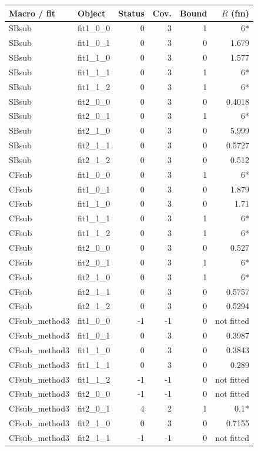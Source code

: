 \documentclass[11pt,a4paper]{article}
\begin{document}
{\scriptsize\begin{longtable}{llrrrr}\hline Macro / fit & Object & Status & Cov. & Bound & $R$ (fm)\\\hline\endhead
SBsub & fit1\_0\_0 & 0 & 3 & 1 & 6*\\
SBsub & fit1\_0\_1 & 0 & 3 & 0 & 1.679\\
SBsub & fit1\_1\_0 & 0 & 3 & 0 & 1.577\\
SBsub & fit1\_1\_1 & 0 & 3 & 1 & 6*\\
SBsub & fit1\_1\_2 & 0 & 3 & 1 & 6*\\
SBsub & fit2\_0\_0 & 0 & 3 & 0 & 0.4018\\
SBsub & fit2\_0\_1 & 0 & 3 & 1 & 6*\\
SBsub & fit2\_1\_0 & 0 & 3 & 0 & 5.999\\
SBsub & fit2\_1\_1 & 0 & 3 & 0 & 0.5727\\
SBsub & fit2\_1\_2 & 0 & 3 & 0 & 0.512\\
CFsub & fit1\_0\_0 & 0 & 3 & 1 & 6*\\
CFsub & fit1\_0\_1 & 0 & 3 & 0 & 1.879\\
CFsub & fit1\_1\_0 & 0 & 3 & 0 & 1.71\\
CFsub & fit1\_1\_1 & 0 & 3 & 1 & 6*\\
CFsub & fit1\_1\_2 & 0 & 3 & 1 & 6*\\
CFsub & fit2\_0\_0 & 0 & 3 & 0 & 0.527\\
CFsub & fit2\_0\_1 & 0 & 3 & 1 & 6*\\
CFsub & fit2\_1\_0 & 0 & 3 & 1 & 6*\\
CFsub & fit2\_1\_1 & 0 & 3 & 0 & 0.5757\\
CFsub & fit2\_1\_2 & 0 & 3 & 0 & 0.5294\\
CFsub\_method3 & fit1\_0\_0 & -1 & -1 & 0 & not fitted\\
CFsub\_method3 & fit1\_0\_1 & 0 & 3 & 0 & 0.3987\\
CFsub\_method3 & fit1\_1\_0 & 0 & 3 & 0 & 0.3843\\
CFsub\_method3 & fit1\_1\_1 & 0 & 3 & 0 & 0.289\\
CFsub\_method3 & fit1\_1\_2 & -1 & -1 & 0 & not fitted\\
CFsub\_method3 & fit2\_0\_0 & -1 & -1 & 0 & not fitted\\
CFsub\_method3 & fit2\_0\_1 & 4 & 2 & 1 & 0.1*\\
CFsub\_method3 & fit2\_1\_0 & 0 & 3 & 0 & 0.7155\\
CFsub\_method3 & fit2\_1\_1 & -1 & -1 & 0 & not fitted\\

\end{longtable}}
\end{document}
